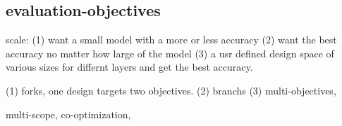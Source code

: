 
\subsection{evaluation-objectives}
scale: 
(1) want a small model with a more or less accuracy
(2) want the best accuracy no matter how large of the model
(3) a usr defined design space of various sizes for differnt layers and get the best accuracy. 

(1) forks, one design targets two objectives. 
(2) branchs
(3) multi-objectives, 

multi-scope, co-optimization, 